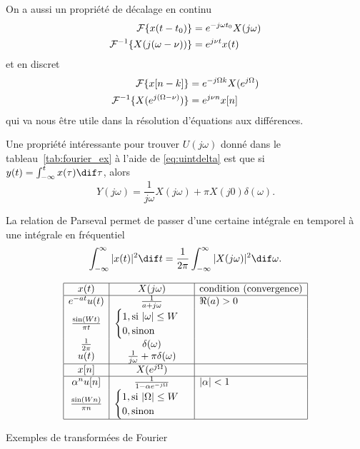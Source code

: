 On a aussi un propriété de décalage en continu
\begin{align*}
  \mathcal{F}\{x(t-t_0)\} & = e^{-j\omega t_0}X(j\omega)\\
  \mathcal{F}^{-1}\{X(j(\omega-\nu))\} & = e^{j\nu t}x(t)
\end{align*}
et en discret
\begin{align*}
  \mathcal{F}\{x[n-k]\} & = e^{-j\Omega k} X(e^{j\Omega})\\
  \mathcal{F}^{-1}\{X(e^{j(\Omega-\nu)})\} & = e^{j\nu n}x[n]
\end{align*}
qui va nous être utile dans la résolution d'équations aux différences.

Une propriété intéressante pour trouver $U(j\omega)$ donné dans le
tableau~\ref{tab:fourier_ex} à l'aide de \eqref{eq:uintdelta} est que si
$y(t) = \int_{-\infty}^t x(\tau) \dif \tau$, alors
\[ Y(j\omega) = \frac{1}{j\omega}X(j\omega) + \pi X(j0)\delta(\omega). \]

La relation de Parseval permet de passer d'une certaine intégrale en temporel
à une intégrale en fréquentiel
\[ \int_{-\infty}^\infty |x(t)|^2 \dif t
= \frac{1}{2\pi} \int_{-\infty}^\infty |X(j\omega)|^2 \dif \omega. \]

\begin{table}
  \[
    \begin{array}{|c|c|l|}
      \hline
      x(t) & X(j\omega) & \text{condition (convergence)}\\
      \hline
      e^{-at}u(t) & \frac{1}{a + j\omega} & \Re(a) > 0\\
      \frac{\sin(Wt)}{\pi t} &
      \begin{cases}
        1, \text{si } |\omega| \leq W\\
        0, \text{sinon}
      \end{cases}
      &\\
      \frac{1}{2\pi} & \delta(\omega) &\\
      u(t) & \frac{1}{j\omega} + \pi \delta(\omega)&\\
      \hline
      x[n] & X(e^{j\Omega}) &\\
      \hline
      \alpha^n u[n] & \frac{1}{1-\alpha e^{-j\Omega}} & |\alpha| < 1\\
      \frac{\sin(Wn)}{\pi n} &
      \begin{cases}
        1, \text{si } |\Omega| \leq W\\
        0, \text{sinon}
      \end{cases}
      &\\
      \hline
    \end{array}
  \]
  \caption{Exemples de transformées de Fourier}
  \label{tab:fourier_ex}
\end{table}


